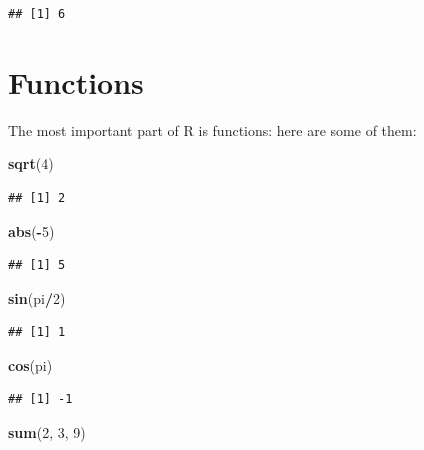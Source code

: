 \documentclass[
]{book}
\newenvironment{Shaded}{\begin{snugshade}}{\end{snugshade}}
\newcommand{\DecValTok}[1]{\textcolor[rgb]{0.00,0.00,0.81}{#1}}
\newcommand{\KeywordTok}[1]{\textcolor[rgb]{0.13,0.29,0.53}{\textbf{#1}}}
\newcommand{\NormalTok}[1]{#1}
\newcommand{\OperatorTok}[1]{\textcolor[rgb]{0.81,0.36,0.00}{\textbf{#1}}}
\begin{document}
\begin{verbatim}
## [1] 6
\end{verbatim}

\hypertarget{functions}{%
\section{Functions}\label{functions}}

The most important part of R is functions: here are some of them:

\begin{Shaded}
\begin{Highlighting}[]
\KeywordTok{sqrt}\NormalTok{(}\DecValTok{4}\NormalTok{)}
\end{Highlighting}
\end{Shaded}

\begin{verbatim}
## [1] 2
\end{verbatim}

\begin{Shaded}
\begin{Highlighting}[]
\KeywordTok{abs}\NormalTok{(}\OperatorTok{-}\DecValTok{5}\NormalTok{)}
\end{Highlighting}
\end{Shaded}

\begin{verbatim}
## [1] 5
\end{verbatim}

\begin{Shaded}
\begin{Highlighting}[]
\KeywordTok{sin}\NormalTok{(pi}\OperatorTok{/}\DecValTok{2}\NormalTok{)}
\end{Highlighting}
\end{Shaded}

\begin{verbatim}
## [1] 1
\end{verbatim}

\begin{Shaded}
\begin{Highlighting}[]
\KeywordTok{cos}\NormalTok{(pi)}
\end{Highlighting}
\end{Shaded}

\begin{verbatim}
## [1] -1
\end{verbatim}

\begin{Shaded}
\begin{Highlighting}[]
\KeywordTok{sum}\NormalTok{(}\DecValTok{2}\NormalTok{, }\DecValTok{3}\NormalTok{, }\DecValTok{9}\NormalTok{)}
\end{Highlighting}
\end{Shaded}
\end{document}
